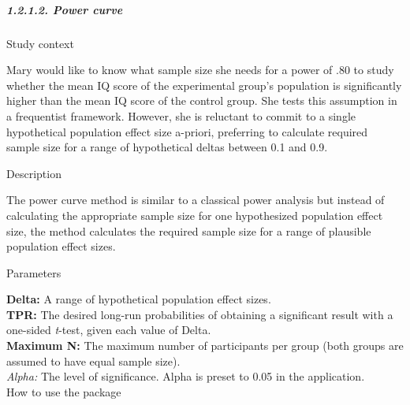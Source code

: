\documentclass[
  english,
  man,floatsintext]{apa6}
\newenvironment{Shaded}{\begin{snugshade}}{\end{snugshade}}
\newcommand{\AttributeTok}[1]{\textcolor[rgb]{0.77,0.63,0.00}{#1}}
\newcommand{\CommentTok}[1]{\textcolor[rgb]{0.56,0.35,0.01}{\textit{#1}}}
\newcommand{\ConstantTok}[1]{\textcolor[rgb]{0.00,0.00,0.00}{#1}}
\newcommand{\DecValTok}[1]{\textcolor[rgb]{0.00,0.00,0.81}{#1}}
\newcommand{\FloatTok}[1]{\textcolor[rgb]{0.00,0.00,0.81}{#1}}
\newcommand{\FunctionTok}[1]{\textcolor[rgb]{0.00,0.00,0.00}{#1}}
\newcommand{\NormalTok}[1]{#1}
\newcommand{\OtherTok}[1]{\textcolor[rgb]{0.56,0.35,0.01}{#1}}
\newcommand{\SpecialCharTok}[1]{\textcolor[rgb]{0.00,0.00,0.00}{#1}}
\let\oldsubparagraph\subparagraph
\renewcommand{\subparagraph}[1]{\oldsubparagraph{#1}\mbox{}}
\begin{document}
\hypertarget{power-curve}{%
\subparagraph{1.2.1.2. Power curve}\label{power-curve}}

Study context

Mary would like to know what sample size she needs for a power of .80 to study whether the mean IQ score of the experimental group's population is significantly higher than the mean IQ score of the control group. She tests this assumption in a frequentist framework. However, she is reluctant to commit to a single hypothetical population effect size a-priori, preferring to calculate required sample size for a range of hypothetical deltas between 0.1 and 0.9.

Description

The power curve method is similar to a classical power analysis but instead of calculating the appropriate sample size for one hypothesized population effect size, the method calculates the required sample size for a range of plausible population effect sizes.

Parameters

\textbf{Delta:} A range of hypothetical population effect sizes.\\
\textbf{TPR:} The desired long-run probabilities of obtaining a significant result with a one-sided \emph{t}-test, given each value of Delta.\\
\textbf{Maximum N:} The maximum number of participants per group (both groups are assumed to have equal sample size).\\
\emph{Alpha:} The level of significance. Alpha is preset to 0.05 in the application.\\

How to use the package

\begin{Shaded}
\end{Shaded}
\end{document}
